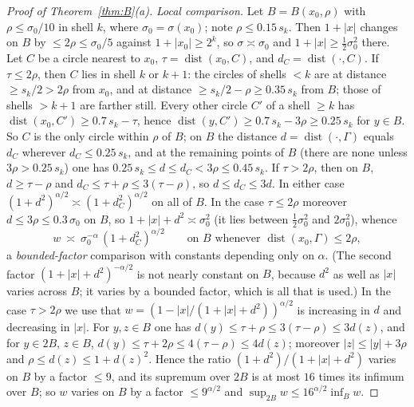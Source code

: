 \documentclass[11pt]{amsart}
\newcommand{\abs}[1]{\lvert #1\rvert}
\DeclareMathOperator{\dist}{dist}
\theoremstyle{plain}
\theoremstyle{definition}
\theoremstyle{remark}
\begin{document}
\begin{proof}[Proof of Theorem~\ref{thm:B}(a)]
\emph{Local comparison.} Let $B=B(x_0,\rho)$ with $\rho\le\sigma_0/10$ in shell
$k$, where $\sigma_0=\sigma(x_0)$; note $\rho\le0.15\,s_k$. Then $1+\abs x$ changes
on $B$ by $\le2\rho\le\sigma_0/5$ against $1+\abs{x_0}\ge2^k$, so
$\sigma\asymp\sigma_0$ and $1+\abs x\ge\tfrac12\sigma_0^2$ there. Let $C$ be a
circle nearest to $x_0$, $\tau=\dist(x_0,C)$, and $d_C=\dist(\cdot,C)$. If
$\tau\le2\rho$, then $C$ lies in shell $k$ or $k+1$: the circles of shells $<k$
are at distance $\ge s_k/2>2\rho$ from $x_0$, and at distance $\ge s_k/2-\rho\ge
0.35\,s_k$ from $B$; those of shells $>k+1$ are farther still. Every other circle
$C'$ of a shell $\ge k$ has $\dist(x_0,C')\ge0.7\,s_k-\tau$, hence
$\dist(y,C')\ge0.7\,s_k-3\rho\ge0.25\,s_k$ for $y\in B$. So $C$ is the only circle
within $\rho$ of $B$; on $B$ the distance $d=\dist(\cdot,\Gamma)$ equals $d_C$
wherever $d_C\le0.25\,s_k$, and at the remaining points of $B$ (there are none
unless $3\rho>0.25\,s_k$) one has $0.25\,s_k\le d\le d_C<3\rho\le0.45\,s_k$. If
$\tau>2\rho$, then on $B$,
$d\ge\tau-\rho$ and $d_C\le\tau+\rho\le3(\tau-\rho)$, so $d\le d_C\le3d$. In either
case $(1+d^2)^{\alpha/2}\asymp(1+d_C^2)^{\alpha/2}$ on all of $B$. In the case
$\tau\le2\rho$ moreover $d\le3\rho\le0.3\,\sigma_0$ on $B$, so
$1+\abs x+d^2\asymp\sigma_0^2$ (it lies between $\tfrac12\sigma_0^2$ and
$2\sigma_0^2$), whence
\begin{equation}\label{eq:wcompare}
w\ \asymp\ \sigma_0^{-\alpha}\,(1+d_C^2)^{\alpha/2}\qquad\text{on }B
\text{ whenever }\dist(x_0,\Gamma)\le2\rho,
\end{equation}
a \emph{bounded-factor} comparison with constants depending only on $\alpha$.
(The second factor $(1+\abs x+d^2)^{-\alpha/2}$ is not nearly constant on $B$,
because $d^2$ as well as $\abs x$ varies across $B$; it varies by a bounded
factor, which is all that is used.)
In the case $\tau>2\rho$ we use that
$w=(1-\abs x/(1+\abs x+d^2))^{\alpha/2}$ is increasing in $d$ and decreasing in
$\abs x$. For $y,z\in B$ one has $d(y)\le\tau+\rho\le3(\tau-\rho)\le3d(z)$, and
for $y\in2B$, $z\in B$, $d(y)\le\tau+2\rho\le4(\tau-\rho)\le4d(z)$; moreover
$\abs z\le\abs y+3\rho$ and $\rho\le d(z)\le1+d(z)^2$. Hence the ratio
$(1+d^2)/(1+\abs x+d^2)$ varies on $B$ by a factor $\le9$, and its supremum over
$2B$ is at most $16$ times its infimum over $B$; so $w$ varies on $B$ by a
factor $\le9^{\alpha/2}$ and $\sup_{2B}w\le16^{\alpha/2}\inf_Bw$.


\end{proof}
\end{document}
